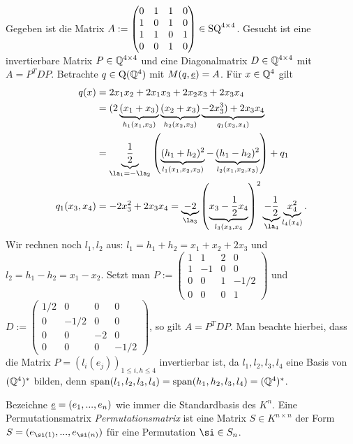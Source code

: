 \documentclass[../../main.tex]{subfiles}
\begin{document}
\begin{bsp}\label{13.5.4}
Gegeben ist die Matrix $A:=\begin{pmatrix}0&1&1&0\\1&0&1&0\\1&1&0&1\\0&0&1&0\end{pmatrix}\in \operatorname{SQ}^{4\times 4}$. Gesucht ist eine invertierbare Matrix $P\in \mathbb Q^{4\times 4}$ und eine Diagonalmatrix $D\in \mathbb Q^{4\times 4}$ mit $A=P^TDP$. Betrachte $q\in \operatorname{Q}(\mathbb Q^4)$ mit $M(q,{\underline e})=A$. Für $x\in \mathbb Q^4$ gilt
\begin{align*}
q(x)&=2x_1x_2+2x_1x_3+2x_2x_3+2x_3x_4\\
&=(2\underbrace{(x_1+x_3)}_{h_1(x_1,x_3)}\underbrace{(x_2+x_3)}_{h_2(x_2,x_3)}\underbrace{-2x_3^3)+2x_3x_4}_{q_1(x_3,x_4)}\\
&=\underbrace{\frac{1}{2}}_{\la_1=-\la_2}\left(\underbrace{(h_1+h_2)^2}_{l_1(x_1,x_2,x_3)}-\underbrace{(h_1-h_2)^2}_{l_2(x_1,x_2,x_3)}\right)+q_1\\
q_1(x_3,x_4)&=-2x_3^2+2x_3x_4=\underbrace{-2}_{\la_3}\left(\underbrace{x_3-\frac{1}{2}x_4}_{l_3(x_3,x_4}\right)^2\underbrace{-\frac{1}{2}}_{\la_4}\underbrace{x_4^2}_{l_4(x_4)}.
\end{align*}
Wir rechnen noch $l_1,l_2$ aus: $l_1=h_1+h_2=x_1+x_2+2x_3$ und $l_2=h_1-h_2=x_1-x_2$. Setzt man $P:=\begin{pmatrix*}1&1&2&0\\1&-1&0&0\\0&0&1&-1/2\\0&0&0&1\end{pmatrix*}$ und $D:=\begin{pmatrix*}1/2 & 0 & 0 & 0\\0&-1/2&0&0\\ 0&0&-2&0\\ 0&0&0&-1/2\end{pmatrix*}$, so gilt $A=P^TDP$. Man beachte hierbei, dass die Matrix $P=(l_i(e_j))_{1\le i,h\le 4}$ invertierbar ist, da $l_1,l_2,l_3,l_4$ eine Basis von $(\mathbb Q^4)^*$ bilden, denn $\operatorname{span}(l_1,l_2,l_3,l_4)=\operatorname{span}(h_1,h_2,l_3,l_4)=(\mathbb Q^4)^*$.
\end{bsp}

\begin{df}\label{13.5.5}
Bezeichne ${\underline e}=(e_1,...,e_n)$ wie immer die Standardbasis des $K^n$. Eine Permutationsmatrix \emph{Permutationsmatrix} ist eine Matrix $S\in K^{n\times n}$ der Form $S=(e_{\si(1)},...,e_{\si(n)})$ für eine Permutation $\si \in S_n$.
\end{df}
	
\end{document}
